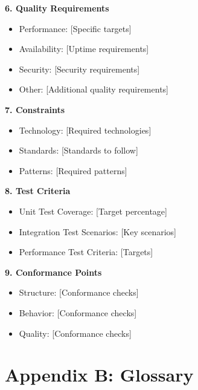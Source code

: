 \documentclass[11pt]{article}
\begin{document}
\begin{devbox}
\textbf{6. Quality Requirements}
\begin{itemize}[nosep]
    \item Performance: [Specific targets]
    \item Availability: [Uptime requirements]
    \item Security: [Security requirements]
    \item Other: [Additional quality requirements]
\end{itemize}

\textbf{7. Constraints}
\begin{itemize}[nosep]
    \item Technology: [Required technologies]
    \item Standards: [Standards to follow]
    \item Patterns: [Required patterns]
\end{itemize}

\textbf{8. Test Criteria}
\begin{itemize}[nosep]
    \item Unit Test Coverage: [Target percentage]
    \item Integration Test Scenarios: [Key scenarios]
    \item Performance Test Criteria: [Targets]
\end{itemize}

\textbf{9. Conformance Points}
\begin{itemize}[nosep]
    \item Structure: [Conformance checks]
    \item Behavior: [Conformance checks]
    \item Quality: [Conformance checks]
\end{itemize}
\end{devbox}

\section{Appendix B: Glossary}
\end{document}

